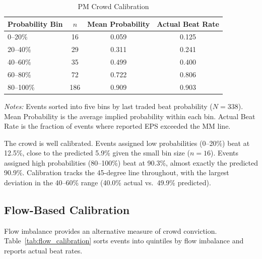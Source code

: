 \documentclass[11pt]{article}
\begin{document}
\begin{table}[htbp]
\centering
\begin{threeparttable}
\caption{PM Crowd Calibration}
\label{tab:calibration}
\begin{tabular}{lccc}
\toprule
Probability Bin & $n$ & Mean Probability & Actual Beat Rate \\
\midrule
0--20\% & 16 & 0.059 & 0.125 \\
20--40\% & 29 & 0.311 & 0.241 \\
40--60\% & 35 & 0.499 & 0.400 \\
60--80\% & 72 & 0.722 & 0.806 \\
80--100\% & 186 & 0.909 & 0.903 \\
\bottomrule
\end{tabular}
\begin{tablenotes}
\small
\item \textit{Notes:} Events sorted into five bins by last traded beat probability ($N = 338$). Mean Probability is the average implied probability within each bin. Actual Beat Rate is the fraction of events where reported EPS exceeded the MM line.
\end{tablenotes}
\end{threeparttable}
\end{table}

The crowd is well calibrated. Events assigned low probabilities (0--20\%) beat at 12.5\%, close to the predicted 5.9\% given the small bin size ($n = 16$). Events assigned high probabilities (80--100\%) beat at 90.3\%, almost exactly the predicted 90.9\%. Calibration tracks the 45-degree line throughout, with the largest deviation in the 40--60\% range (40.0\% actual vs.\ 49.9\% predicted).

\subsection{Flow-Based Calibration}

Flow imbalance provides an alternative measure of crowd conviction. Table~\ref{tab:flow_calibration} sorts events into quintiles by flow imbalance and reports actual beat rates.
\end{document}
